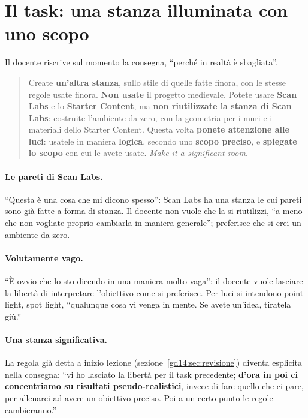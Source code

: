 \section{Il task: una stanza illuminata con uno scopo}
\label{gd14:sec:task}

Il docente riscrive sul momento la consegna, ``perché in realtà è sbagliata''.

\begin{quote}
Create \textbf{un'altra stanza}, sullo stile di quelle fatte finora, con le stesse
regole usate finora. \textbf{Non usate} il progetto medievale. Potete usare
\textbf{Scan Labs} e lo \textbf{Starter Content}, ma \textbf{non riutilizzate la
stanza di Scan Labs}: costruite l'ambiente da zero, con la geometria per i muri e i
materiali dello Starter Content. Questa volta \textbf{ponete attenzione alle
luci}: usatele in maniera \textbf{logica}, secondo uno \textbf{scopo preciso}, e
\textbf{spiegate lo scopo} con cui le avete usate. \emph{Make it a significant
room}.
\end{quote}

\paragraph{Le pareti di Scan Labs.} ``Questa è una cosa che mi dicono spesso'': Scan
Labs ha una stanza le cui pareti sono già fatte a forma di stanza. Il docente non
vuole che la si riutilizzi, ``a meno che non vogliate proprio cambiarla in maniera
generale''; preferisce che si crei un ambiente da zero.

\paragraph{Volutamente vago.} ``È ovvio che lo sto dicendo in una maniera molto vaga'':
il docente vuole lasciare la libertà di interpretare l'obiettivo come si preferisce.
Per luci si intendono point light, spot light, ``qualunque cosa vi venga in mente.
Se avete un'idea, tiratela giù.''

\paragraph{Una stanza significativa.} La regola già detta a inizio lezione
(sezione~\ref{gd14:sec:revisione}) diventa esplicita nella consegna: ``vi ho lasciato
la libertà per il task precedente; \textbf{d'ora in poi ci concentriamo su risultati
pseudo-realistici}, invece di fare quello che ci pare, per allenarci ad avere un
obiettivo preciso. Poi a un certo punto le regole cambieranno.''

